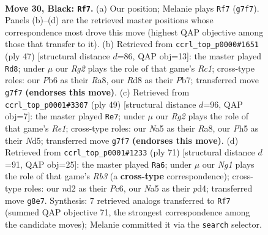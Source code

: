 \documentclass[11pt]{article}
\begin{document}
\clearpage

\begin{figure}[p]\centering
\begin{subfigure}{0.46\textwidth}\centering
\resizebox{\linewidth}{!}{%
\newchessgame
\chessboard[
  setfen={3rbbn1/p1k3r1/1p2p1p1/nP1pP1Pp/P2P1P1K/8/3N4/RNB2B1R b - - 15 30},
  showmover=false,
  pgfstyle=straightmove, color=movearrow, markmove={g7-f7}
]}
\caption{}
\end{subfigure}\hfill
\begin{subfigure}{0.46\textwidth}\centering
\resizebox{\linewidth}{!}{%
\newchessgame
\chessboard[
  setfen={r1r3k1/1p1nbpp1/2p1p1n1/7p/p1PP4/P1N2N1P/1P3PPB/2RR1K2 b - - 4 24},
  showmover=false,
  pgfstyle=straightmove, color=movearrow, markmove={c8-d8}
]}
\caption{}
\end{subfigure}
\\[4pt]
\begin{subfigure}{0.46\textwidth}\centering
\resizebox{\linewidth}{!}{%
\newchessgame
\chessboard[
  setfen={r3r1k1/1p4p1/2p1b2p/3n1p2/p1BPp3/P3P2P/1PRN1PPK/1R6 b - - 5 25},
  showmover=false,
  pgfstyle=straightmove, color=movearrow, markmove={e8-e7}
]}
\caption{}
\end{subfigure}\hfill
\begin{subfigure}{0.46\textwidth}\centering
\resizebox{\linewidth}{!}{%
\newchessgame
\chessboard[
  setfen={1n5r/p3bk2/1rp1p3/1p2Pp2/1P1P2pp/P5P1/N1R1KP1P/2BR4 b - - 2 36},
  showmover=false,
  pgfstyle=straightmove, color=movearrow, markmove={b6-a6}
]}
\caption{}
\end{subfigure}
\caption{\textbf{Move 30, Black: \texttt{Rf7}.} (a) Our position; Melanie plays \texttt{Rf7} (\texttt{g7f7}). Panels (b)--(d) are the retrieved master positions whose correspondence most drove this move (highest QAP objective among those that transfer to it). (b) Retrieved from \texttt{ccrl\_top\_p0000\#1651} (ply 47) [structural distance $d$=86, QAP obj=13]: the master played \texttt{Rd8}; under $\mu$ our \emph{Rg2} plays the role of that game's \emph{Rc1}; cross-type roles: our \emph{P}b6 as their \emph{R}a8, our \emph{R}d8 as their \emph{P}b7; transferred move \texttt{g7f7} \textbf{(endorses this move)}. (c) Retrieved from \texttt{ccrl\_top\_p0001\#3307} (ply 49) [structural distance $d$=96, QAP obj=7]: the master played \texttt{Re7}; under $\mu$ our \emph{Rg2} plays the role of that game's \emph{Re1}; cross-type roles: our \emph{N}a5 as their \emph{R}a8, our \emph{P}h5 as their \emph{N}d5; transferred move \texttt{g7f7} \textbf{(endorses this move)}. (d) Retrieved from \texttt{ccrl\_top\_p0001\#1233} (ply 71) [structural distance $d$=91, QAP obj=25]: the master played \texttt{Ra6}; under $\mu$ our \emph{Ng1} plays the role of that game's \emph{Rb3} (a \textbf{cross-type} correspondence); cross-type roles: our \emph{n}d2 as their \emph{P}c6, our \emph{N}a5 as their \emph{p}d4; transferred move \texttt{g8e7}. Synthesis: 7 retrieved analogs transferred to \texttt{Rf7} (summed QAP objective 71, the strongest correspondence among the candidate moves); Melanie committed it via the \texttt{search} selector.}
\label{fig:thought-m59}
\end{figure}
\end{document}
